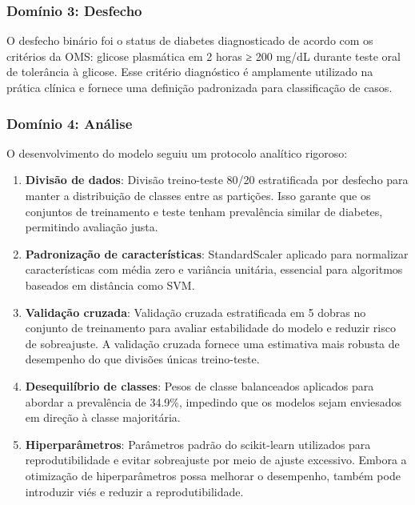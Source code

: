 \subsubsection{Domínio 3: Desfecho}

O desfecho binário foi o status de diabetes diagnosticado de acordo com 
os critérios da OMS: glicose plasmática em 2 horas ≥ 200 mg/dL durante 
teste oral de tolerância à glicose. Esse critério diagnóstico é amplamente 
utilizado na prática clínica e fornece uma definição padronizada para 
classificação de casos.

\subsubsection{Domínio 4: Análise}

O desenvolvimento do modelo seguiu um protocolo analítico rigoroso:

\begin{enumerate}[leftmargin=*]
    \item \textbf{Divisão de dados}: Divisão treino-teste 80/20 estratificada 
          por desfecho para manter a distribuição de classes entre as 
          partições. Isso garante que os conjuntos de treinamento e teste 
          tenham prevalência similar de diabetes, permitindo avaliação justa.
    \item \textbf{Padronização de características}: StandardScaler aplicado 
          para normalizar características com média zero e variância unitária, 
          essencial para algoritmos baseados em distância como SVM.
    \item \textbf{Validação cruzada}: Validação cruzada estratificada em 5 
          dobras no conjunto de treinamento para avaliar estabilidade do 
          modelo e reduzir risco de sobreajuste. A validação cruzada fornece 
          uma estimativa mais robusta de desempenho do que divisões únicas 
          treino-teste.
    \item \textbf{Desequilíbrio de classes}: Pesos de classe balanceados 
          aplicados para abordar a prevalência de 34.9\%, impedindo que os 
          modelos sejam enviesados em direção à classe majoritária.
    \item \textbf{Hiperparâmetros}: Parâmetros padrão do scikit-learn 
          utilizados para reprodutibilidade e evitar sobreajuste por meio 
          de ajuste excessivo. Embora a otimização de hiperparâmetros possa 
          melhorar o desempenho, também pode introduzir viés e reduzir a 
          reprodutibilidade.
\end{enumerate}

